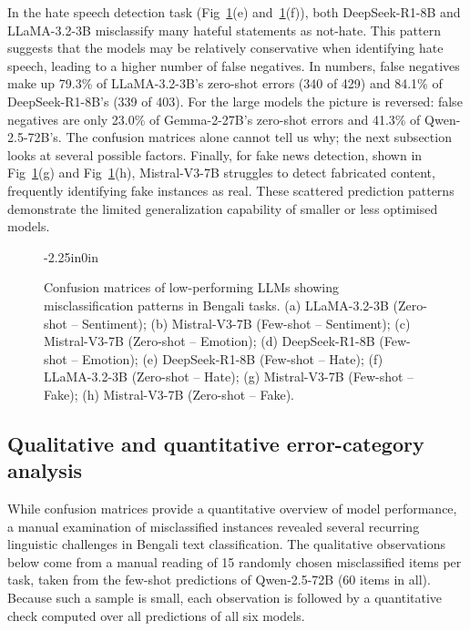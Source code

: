 \documentclass[10pt,letterpaper]{article}
\begin{document}
In the hate speech detection task (Fig~\ref{fig:confusion_matrices_worst}(e) and~\ref{fig:confusion_matrices_worst}(f)), both DeepSeek-R1-8B and LLaMA-3.2-3B misclassify many hateful statements as not-hate. This pattern suggests that the models may be relatively conservative when identifying hate speech, leading to a higher number of false negatives. In numbers, false negatives make up 79.3\% of LLaMA-3.2-3B's zero-shot errors (340 of 429) and 84.1\% of DeepSeek-R1-8B's (339 of 403). For the large models the picture is reversed: false negatives are only 23.0\% of Gemma-2-27B's zero-shot errors and 41.3\% of Qwen-2.5-72B's. The confusion matrices alone cannot tell us why; the next subsection looks at several possible factors. Finally, for fake news detection, shown in Fig~\ref{fig:confusion_matrices_worst}(g) and Fig~\ref{fig:confusion_matrices_worst}(h), Mistral-V3-7B struggles to detect fabricated content, frequently identifying fake instances as real. These scattered prediction patterns demonstrate the limited generalization capability of smaller or less optimised models.



\begin{figure}[!t]
\begin{adjustwidth}{-2.25in}{0in}
    \centering
    \caption{Confusion matrices of low-performing LLMs showing misclassification patterns in Bengali tasks. (a) LLaMA-3.2-3B (Zero-shot – Sentiment); (b) Mistral-V3-7B (Few-shot – Sentiment); (c) Mistral-V3-7B (Zero-shot – Emotion); (d) DeepSeek-R1-8B (Few-shot – Emotion); (e) DeepSeek-R1-8B (Few-shot – Hate); (f) LLaMA-3.2-3B (Zero-shot – Hate); (g) Mistral-V3-7B (Few-shot – Fake); (h) Mistral-V3-7B (Zero-shot – Fake).}
    \label{fig:confusion_matrices_worst}
\end{adjustwidth}
\end{figure}


\subsection*{Qualitative and quantitative error-category analysis}

While confusion matrices provide a quantitative overview of model performance, a manual examination of misclassified instances revealed several recurring linguistic challenges in Bengali text classification. The qualitative observations below come from a manual reading of 15 randomly chosen misclassified items per task, taken from the few-shot predictions of Qwen-2.5-72B (60 items in all). Because such a sample is small, each observation is followed by a quantitative check computed over all predictions of all six models.
\end{document}
